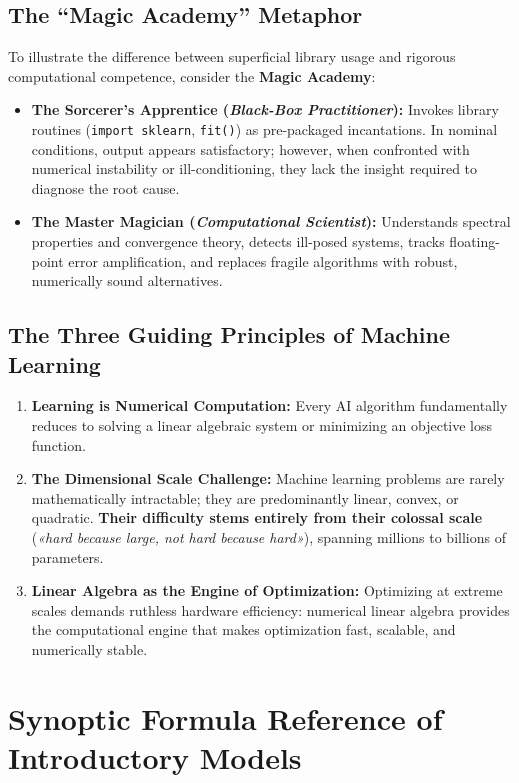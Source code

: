 \subsection{The ``Magic Academy'' Metaphor}
To illustrate the difference between superficial library usage and rigorous computational competence, consider the \textbf{Magic Academy}:
\begin{itemize}
    \item \textbf{The Sorcerer's Apprentice (\textit{Black-Box Practitioner}):} Invokes library routines (\texttt{import sklearn}, \texttt{fit()}) as pre-packaged incantations. In nominal conditions, output appears satisfactory; however, when confronted with numerical instability or ill-conditioning, they lack the insight required to diagnose the root cause.
    \item \textbf{The Master Magician (\textit{Computational Scientist}):} Understands spectral properties and convergence theory, detects ill-posed systems, tracks floating-point error amplification, and replaces fragile algorithms with robust, numerically sound alternatives.
\end{itemize}

\subsection{The Three Guiding Principles of Machine Learning}
\begin{enumerate}
    \item \textbf{Learning is Numerical Computation:} Every AI algorithm fundamentally reduces to solving a linear algebraic system or minimizing an objective loss function.
    \item \textbf{The Dimensional Scale Challenge:} Machine learning problems are rarely mathematically intractable; they are predominantly linear, convex, or quadratic. \textbf{Their difficulty stems entirely from their colossal scale} (\textit{«hard because large, not hard because hard»}), spanning millions to billions of parameters.
    \item \textbf{Linear Algebra as the Engine of Optimization:} Optimizing at extreme scales demands ruthless hardware efficiency: numerical linear algebra provides the computational engine that makes optimization fast, scalable, and numerically stable.
\end{enumerate}

\FloatBarrier
\section{Synoptic Formula Reference of Introductory Models}

